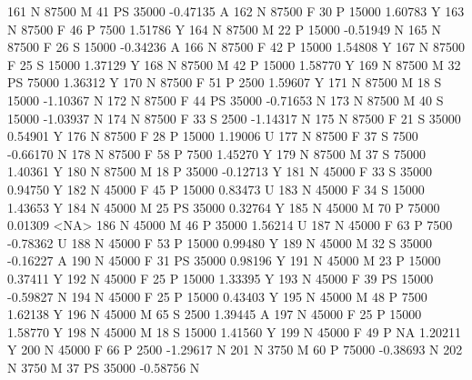 \documentclass{article}
\begin{document}
\begin{Schunk}
\begin{Soutput}
161       N      87500   M  41        PS  35000  -0.47135    A
162       N      87500   F  30         P  15000   1.60783    Y
163       N      87500   F  46         P   7500   1.51786    Y
164       N      87500   M  22         P  15000  -0.51949    N
165       N      87500   F  26         S  15000  -0.34236    A
166       N      87500   F  42         P  15000   1.54808    Y
167       N      87500   F  25         S  15000   1.37129    Y
168       N      87500   M  42         P  15000   1.58770    Y
169       N      87500   M  32        PS  75000   1.36312    Y
170       N      87500   F  51         P   2500   1.59607    Y
171       N      87500   M  18         S  15000  -1.10367    N
172       N      87500   F  44        PS  35000  -0.71653    N
173       N      87500   M  40         S  15000  -1.03937    N
174       N      87500   F  33         S   2500  -1.14317    N
175       N      87500   F  21         S  35000   0.54901    Y
176       N      87500   F  28         P  15000   1.19006    U
177       N      87500   F  37         S   7500  -0.66170    N
178       N      87500   F  58         P   7500   1.45270    Y
179       N      87500   M  37         S  75000   1.40361    Y
180       N      87500   M  18         P  35000  -0.12713    Y
181       N      45000   F  33         S  35000   0.94750    Y
182       N      45000   F  45         P  15000   0.83473    U
183       N      45000   F  34         S  15000   1.43653    Y
184       N      45000   M  25        PS  35000   0.32764    Y
185       N      45000   M  70         P  75000   0.01309 <NA>
186       N      45000   M  46         P  35000   1.56214    U
187       N      45000   F  63         P   7500  -0.78362    U
188       N      45000   F  53         P  15000   0.99480    Y
189       N      45000   M  32         S  35000  -0.16227    A
190       N      45000   F  31        PS  35000   0.98196    Y
191       N      45000   M  23         P  15000   0.37411    Y
192       N      45000   F  25         P  15000   1.33395    Y
193       N      45000   F  39        PS  15000  -0.59827    N
194       N      45000   F  25         P  15000   0.43403    Y
195       N      45000   M  48         P   7500   1.62138    Y
196       N      45000   M  65         S   2500   1.39445    A
197       N      45000   F  25         P  15000   1.58770    Y
198       N      45000   M  18         S  15000   1.41560    Y
199       N      45000   F  49         P     NA   1.20211    Y
200       N      45000   F  66         P   2500  -1.29617    N
201       N       3750   M  60         P  75000  -0.38693    N
202       N       3750   M  37        PS  35000  -0.58756    N

\end{Soutput}
\end{Schunk}
\end{document}
